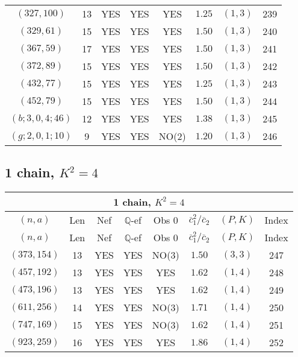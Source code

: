 \begin{longtable}{|c|c|c|c|c|c|c|c|}
$(327,100)$ & 13 & YES & YES & YES & $1.25$ & $(1,3)$ & 239\\
$(329,61)$ & 15 & YES & YES & YES & $1.50$ & $(1,3)$ & 240\\
$(367,59)$ & 17 & YES & YES & YES & $1.50$ & $(1,3)$ & 241\\
$(372,89)$ & 15 & YES & YES & YES & $1.50$ & $(1,3)$ & 242\\
$(432,77)$ & 15 & YES & YES & YES & $1.25$ & $(1,3)$ & 243\\
$(452,79)$ & 15 & YES & YES & YES & $1.50$ & $(1,3)$ & 244\\
$(b;3,0,4;46)$ & 12 & YES & YES & YES & $1.38$ & $(1,3)$ & 245\\
$(g;2,0,1;10)$ & 9 & YES & YES & NO(2) & $1.20$ & $(1,3)$ & 246
\end{longtable}
\subsection{1 chain, $K^2 = 4$}
\begin{longtable}{|c|c|c|c|c|c|c|c|}
\hline
\multicolumn{8}{|c|}{1 chain, $K^2 = 4$}\\
\hline
$(n,a)$ & Len & Nef & $\mathbb Q$-ef & Obs 0 & $\overline c_1^2 / \overline c_2$ & $(P,K)$ & Index\\
\hline
\endfirsthead

\hline
$(n,a)$ & Len & Nef & $\mathbb Q$-ef & Obs 0 & $\overline c_1^2 / \overline c_2$ & $(P,K)$ & Index\\
\hline
\endhead
\hline
\endfoot

$(373,154)$ & 13 & YES & YES & NO(3) & $1.50$ & $(3,3)$ & 247\\
$(457,192)$ & 13 & YES & YES & YES & $1.62$ & $(1,4)$ & 248\\
$(473,196)$ & 13 & YES & YES & YES & $1.62$ & $(1,4)$ & 249\\
$(611,256)$ & 14 & YES & YES & NO(3) & $1.71$ & $(1,4)$ & 250\\
$(747,169)$ & 15 & YES & YES & NO(3) & $1.62$ & $(1,4)$ & 251\\
$(923,259)$ & 16 & YES & YES & YES & $1.86$ & $(1,4)$ & 252
\end{longtable}
